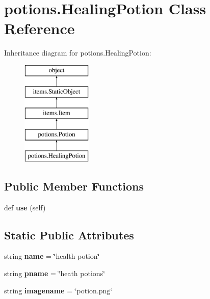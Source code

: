 \hypertarget{classpotions_1_1_healing_potion}{}\section{potions.\+Healing\+Potion Class Reference}
\label{classpotions_1_1_healing_potion}
Inheritance diagram for potions.\+Healing\+Potion\+:\begin{figure}[H]
\begin{center}
\leavevmode
\includegraphics[height=5.000000cm]{classpotions_1_1_healing_potion}
\end{center}
\end{figure}
\subsection*{Public Member Functions}
\begin{DoxyCompactItemize}
\item 
\hypertarget{classpotions_1_1_healing_potion_a79838a47c193d670a524f96c75108fa1}{}def {\bfseries use} (self)\label{classpotions_1_1_healing_potion_a79838a47c193d670a524f96c75108fa1}

\end{DoxyCompactItemize}
\subsection*{Static Public Attributes}
\begin{DoxyCompactItemize}
\item 
\hypertarget{classpotions_1_1_healing_potion_af1cb6e57335c8f801f78361f91bac1dd}{}string {\bfseries name} = \char`\"{}health potion\char`\"{}\label{classpotions_1_1_healing_potion_af1cb6e57335c8f801f78361f91bac1dd}

\item 
\hypertarget{classpotions_1_1_healing_potion_a159a26566e68c13245d828df4f3b695c}{}string {\bfseries pname} = \char`\"{}heath potions\char`\"{}\label{classpotions_1_1_healing_potion_a159a26566e68c13245d828df4f3b695c}

\item 
\hypertarget{classpotions_1_1_healing_potion_aa41cc5525f75f67f62a16e6342c36b22}{}string {\bfseries imagename} = \char`\"{}potion.\+png\char`\"{}\label{classpotions_1_1_healing_potion_aa41cc5525f75f67f62a16e6342c36b22}

\end{DoxyCompactItemize}
